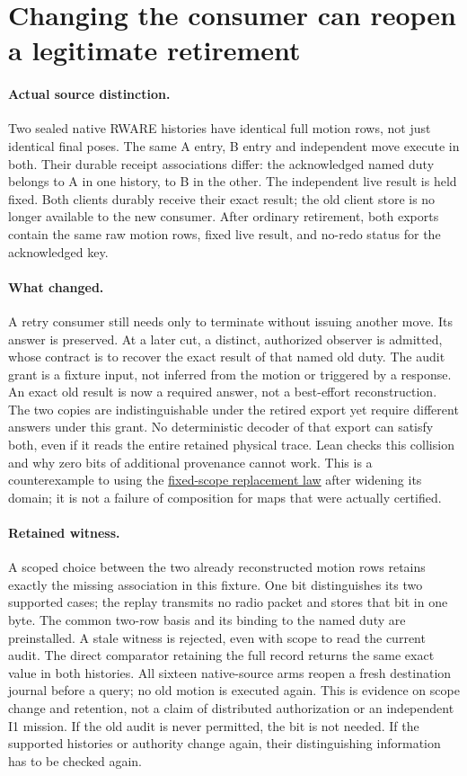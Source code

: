 \documentclass{article}
\begin{document}
\section*{Changing the consumer can reopen a legitimate retirement}
\paragraph{Actual source distinction.}
Two sealed native RWARE histories have identical full motion rows,
not just identical final poses. The same A entry, B entry and
independent move execute in both. Their durable receipt associations
differ: the acknowledged named duty belongs to A in one history,
to B in the other. The independent live result is held fixed.
Both clients durably receive their exact result; the old client store
is no longer available to the new consumer. After ordinary retirement,
both exports contain the same raw motion rows, fixed live result,
and no-redo status for the acknowledged key.

\paragraph{What changed.}
A retry consumer still needs only to terminate without issuing
another move. Its answer is preserved. At a later cut, a distinct,
authorized observer is admitted, whose contract is to recover the
exact result of that named old duty. The audit grant is a fixture
input, not inferred from the motion or triggered by a response.
An exact old result is now a required answer, not a best-effort
reconstruction. The two copies are indistinguishable under the
retired export yet require different answers under this grant. No
deterministic decoder of that export can satisfy both, even if it
reads the entire retained physical trace. Lean checks this collision
and why zero bits of additional provenance cannot work. This is a
counterexample to using the
\href{https://github.com/eternal-november/eos-research-programmes/pull/817}{fixed-scope replacement law}
after widening its domain; it is not a failure of composition for
maps that were actually certified.

\paragraph{Retained witness.}
A scoped choice between the two already reconstructed motion rows
retains exactly the missing association in this fixture. One bit
distinguishes its two supported cases; the replay transmits no
radio packet and stores that bit in one byte. The common two-row
basis and its binding to the named duty are preinstalled. A stale
witness is rejected, even with scope to read the current audit.
The direct comparator retaining the full record returns the same
exact value in both histories. All sixteen native-source arms
reopen a fresh destination journal before a query; no old motion
is executed again. This is evidence on scope change and retention,
not a claim of distributed authorization or an independent I1
mission. If the old audit is never permitted, the bit is not
needed. If the supported histories or authority change again,
their distinguishing information has to be checked again.
\end{document}
